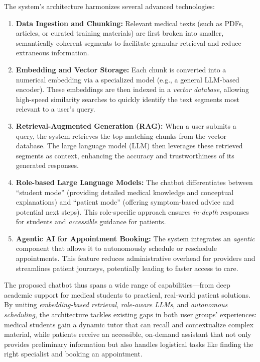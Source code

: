 \noindent The system’s architecture harmonizes several advanced technologies:
\begin{enumerate}
    \item \textbf{Data Ingestion and Chunking:} Relevant medical texts (such as PDFs, articles, or curated training materials) are first broken into smaller, semantically coherent segments to facilitate granular retrieval and reduce extraneous information.
    \item \textbf{Embedding and Vector Storage:} Each chunk is converted into a numerical embedding via a specialized model (e.g., a general LLM-based encoder). These embeddings are then indexed in a \emph{vector database}, allowing high-speed similarity searches to quickly identify the text segments most relevant to a user’s query.
    \item \textbf{Retrieval-Augmented Generation (RAG):} When a user submits a query, the system retrieves the top-matching chunks from the vector database. The large language model (LLM) then leverages these retrieved segments as context, enhancing the accuracy and trustworthiness of its generated responses.
    \item \textbf{Role-based Large Language Models:} The chatbot differentiates between “student mode” (providing detailed medical knowledge and conceptual explanations) and “patient mode” (offering symptom-based advice and potential next steps). This role-specific approach ensures \emph{in-depth} responses for students and \emph{accessible} guidance for patients.
    \item \textbf{Agentic AI for Appointment Booking:} The system integrates an \emph{agentic} component that allows it to autonomously schedule or reschedule appointments. This feature reduces administrative overhead for providers and streamlines patient journeys, potentially leading to faster access to care.
\end{enumerate}

\noindent The proposed chatbot thus spans a wide range of capabilities—from deep academic support for medical students to practical, real-world patient solutions. By uniting \emph{embedding-based retrieval}, \emph{role-aware LLMs}, and \emph{autonomous scheduling}, the architecture tackles existing gaps in both user groups’ experiences: medical students gain a dynamic tutor that can recall and contextualize complex material, while patients receive an accessible, on-demand assistant that not only provides preliminary information but also handles logistical tasks like finding the right specialist and booking an appointment.

